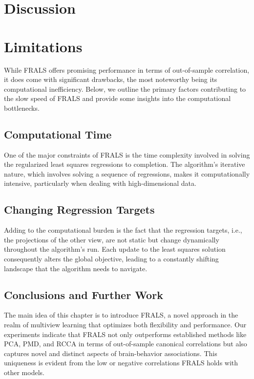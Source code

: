 \section{Discussion}


\section{Limitations}\label{sec:limitations}

While FRALS offers promising performance in terms of out-of-sample correlation, it does come with significant drawbacks, the most noteworthy being its computational inefficiency. Below, we outline the primary factors contributing to the slow speed of FRALS and provide some insights into the computational bottlenecks.

\subsection{Computational Time}\label{subsec:computational-time}
One of the major constraints of FRALS is the time complexity involved in solving the regularized least squares regressions to completion. The algorithm’s iterative nature, which involves solving a sequence of regressions, makes it computationally intensive, particularly when dealing with high-dimensional data.

\subsection{Changing Regression Targets}\label{subsec:changing-regression-targets}
Adding to the computational burden is the fact that the regression targets, i.e., the projections of the other view, are not static but change dynamically throughout the algorithm's run.
Each update to the least squares solution consequently alters the global objective, leading to a constantly shifting landscape that the algorithm needs to navigate.





\subsection{Conclusions and Further Work}
The main idea of this chapter is to introduce FRALS, a novel approach in the realm of multiview learning that optimizes
both flexibility and performance.
Our experiments indicate that FRALS not only outperforms established methods like PCA, PMD, and RCCA in terms of out-of-sample canonical correlations but also captures novel and distinct aspects of brain-behavior associations.
This uniqueness is evident from the low or negative correlations FRALS holds with other models.

